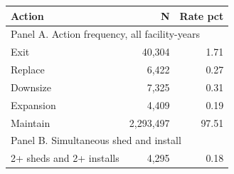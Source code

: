 \begin{tabular}{lrr}
\toprule
Action & N & Rate pct \\
\midrule
\multicolumn{3}{l}{Panel A. Action frequency, all facility-years} \\
\midrule
Exit &    40,304 & 1.71 \\
Replace &     6,422 & 0.27 \\
Downsize &     7,325 & 0.31 \\
Expansion &     4,409 & 0.19 \\
Maintain & 2,293,497 & 97.51 \\
\multicolumn{3}{l}{Panel B. Simultaneous shed and install} \\
\midrule
2+ sheds and 2+ installs &     4,295 & 0.18 \\
\bottomrule
\end{tabular}
